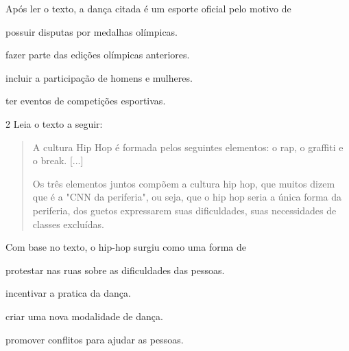 Após ler o texto, a dança citada é um esporte oficial pelo motivo de

\begin{escolha}
\item possuir disputas por medalhas olímpicas.

\item fazer parte das edições olímpicas anteriores.

\item incluir a participação de homens e mulheres.

\item ter eventos de competições esportivas.
\end{escolha}


\num{2} Leia o texto a seguir:

\begin{quote}
A cultura Hip Hop é formada pelos seguintes elementos: o rap, o graffiti
e o break. {[}...{]}

Os três elementos juntos compõem a cultura hip hop, que muitos dizem que
é a "CNN da periferia", ou seja, que o hip hop seria a única forma da
periferia, dos guetos expressarem suas dificuldades, suas necessidades
de classes excluídas.

\end{quote}

Com base no texto, o hip-hop surgiu como uma forma de

\begin{escolha}
\item protestar nas ruas sobre as dificuldades das pessoas.

\item incentivar a pratica da dança.

\item criar uma nova modalidade de dança.

\item promover conflitos para ajudar as pessoas.
\end{escolha}

